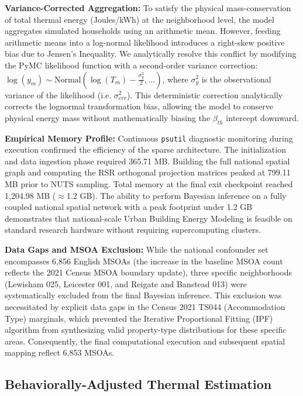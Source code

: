 \documentclass[11pt, a4paper, twocolumn, numbers]{elsarticle}
\begin{document}
\textbf{Variance-Corrected Aggregation:} To satisfy the physical mass-conservation of total thermal energy (Joules/kWh) at the neighborhood level, the model aggregates simulated households using an arithmetic mean. However, feeding arithmetic means into a log-normal likelihood introduces a right-skew positive bias due to Jensen's Inequality. We analytically resolve this conflict by modifying the PyMC likelihood function with a second-order variance correction: $\log(y_m) \sim \text{Normal}\left( \log(T_m) - \frac{\sigma_{y}^2}{2}, \dots \right)$, where $\sigma_{y}^2$ is the observational variance of the likelihood (i.e. $\sigma_{err}^2$). This deterministic correction analytically corrects the lognormal transformation bias, allowing the model to conserve physical energy mass without mathematically biasing the $\beta_{th}$ intercept downward.

\textbf{Empirical Memory Profile:} Continuous \texttt{psutil} diagnostic monitoring during execution confirmed the efficiency of the sparse architecture. The initialization and data ingestion phase required 365.71 MB. Building the full national spatial graph and computing the RSR orthogonal projection matrices peaked at 799.11 MB prior to NUTS sampling. Total memory at the final exit checkpoint reached 1,204.98 MB ($\approx$1.2 GB). The ability to perform Bayesian inference on a fully coupled national spatial network with a peak footprint under 1.2 GB demonstrates that national-scale Urban Building Energy Modeling is feasible on standard research hardware without requiring supercomputing clusters.

\textbf{Data Gaps and MSOA Exclusion:} While the national confounder set 
encompasses 6,856 English MSOAs (the increase in the baseline MSOA count reflects the 2021 Census MSOA boundary update), three specific neighborhoods (Lewisham 025, 
Leicester 001, and Reigate and Banstead 013) were systematically excluded from 
the final Bayesian inference. This exclusion was necessitated by explicit data gaps in the 
Census 2021 TS044 (Accommodation Type) marginals, which prevented the 
Iterative Proportional Fitting (IPF) algorithm from synthesizing valid 
property-type distributions for these specific areas. Consequently, the final 
computational execution and subsequent spatial mapping reflect 6,853 MSOAs.

\subsection{Behaviorally-Adjusted Thermal Estimation}\label{behaviorally-adjusted-thermal-estimation}
\end{document}
